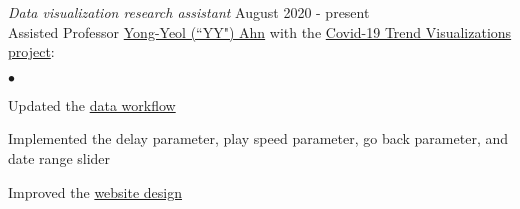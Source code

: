 \documentclass[margin,line, 10pt]{res}
\newenvironment{list2}{
  \begin{list}{$\bullet$}{%
      \setlength{\itemsep}{0in}
      \setlength{\parsep}{0in} \setlength{\parskip}{0in}
      \setlength{\topsep}{0in} \setlength{\partopsep}{0in} 
      \setlength{\leftmargin}{0.2in}}}{\end{list}}
\begin{document}
\begin{resume}
\vspace{-.3cm}
{\em Data visualization research assistant} \hfill { August 2020 - present}\\
Assisted Professor \href{http://yongyeol.com/}{Yong-Yeol (``YY") Ahn} with the \href{https://yyahn.com/covid19-dashboard/}{Covid-19 Trend Visualizations project}:

\vspace*{.05in}  
\begin{list2}
\item Updated the \href{https://github.com/covid19-data/covid19-data}{data workflow}
\item Implemented the delay parameter, play speed parameter, go back parameter, and date range slider
\item Improved the \href{https://github.com/covid19-data/covid19-dashboard}{website design}
\end{list2}






\end{resume}
\end{document}
